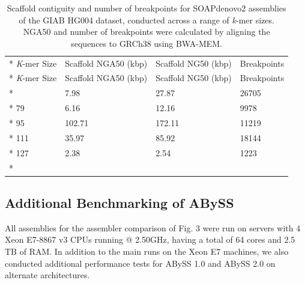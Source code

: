 \documentclass[
  12pt,
  oneside,
  openany]{book}
\begin{document}
\begin{appendices}
\hypertarget{tbl:ksoapdenovo}{}
\begin{singlespace}
\small
\begin{longtable}[]{@{}llll@{}}
\caption[Scaffold contiguity and number of breakpoints for SOAPdenovo2 assemblies of the GIAB HG004 dataset, conducted across a range of \emph{k}-mer sizes.]{\label{tbl:ksoapdenovo}Scaffold contiguity and number of breakpoints for SOAPdenovo2 assemblies of the GIAB HG004 dataset, conducted across a range of \emph{k}-mer sizes. NGA50 and number of breakpoints were calculated by aligning the sequences to GRCh38 using BWA-MEM.}\tabularnewline*
\toprule
\emph{K}-mer Size & Scaffold NGA50 (kbp) & Scaffold NG50 (kbp) & Breakpoints\tabularnewline*
\midrule
\endfirsthead
\toprule
\emph{K}-mer Size & Scaffold NGA50 (kbp) & Scaffold NG50 (kbp) & Breakpoints\tabularnewline*
\midrule
\endhead
63 & 7.98 & 27.87 & 26705\tabularnewline*
79 & 6.16 & 12.16 & 9978\tabularnewline*
95 & 102.71 & 172.11 & 11219\tabularnewline*
111 & 35.97 & 85.92 & 18144\tabularnewline*
127 & 2.38 & 2.54 & 1223\tabularnewline*
\bottomrule
\end{longtable}
\end{singlespace}

\hypertarget{additional-benchmarking-of-abyss}{%
\subsection{Additional Benchmarking of ABySS}\label{additional-benchmarking-of-abyss}}

All assemblies for the assembler comparison of Fig. 3 were run on servers with 4 Xeon E7-8867 v3 CPUs running @ 2.50GHz, having a total of 64 cores and 2.5 TB of RAM. In addition to the main runs on the Xeon E7 machines, we also conducted additional performance tests for ABySS 1.0 and ABySS 2.0 on alternate architectures.


\end{appendices}
\end{document}
